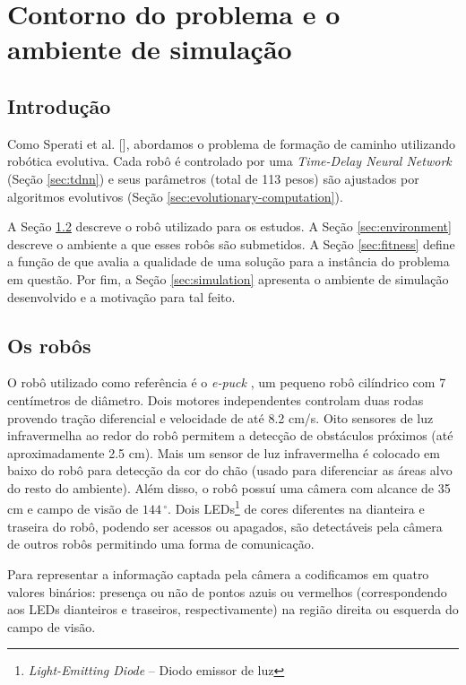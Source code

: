 \chapter{Contorno do problema e o ambiente de simulação}
\label{cha:problem-limits}

\section{Introdução}

Como Sperati et al. [\cite{sperati2011path}], abordamos o problema de formação de caminho utilizando robótica evolutiva. Cada robô é controlado por uma \textit{Time-Delay Neural Network} (Seção \ref{sec:tdnn}) e seus parâmetros (total de 113 pesos) são ajustados por algoritmos evolutivos (Seção \ref{sec:evolutionary-computation}).

A Seção \ref{sec:robots} descreve o robô utilizado para os estudos. A Seção \ref{sec:environment} descreve o ambiente a que esses robôs são submetidos. A Seção \ref{sec:fitness} define a função de \fitness que avalia a qualidade de uma solução para a instância do problema em questão. Por fim, a Seção \ref{sec:simulation} apresenta o ambiente de simulação desenvolvido e a motivação para tal feito.

\section{Os robôs}
\label{sec:robots}

O robô utilizado como referência é o \textit{e-puck} \cite{mondada2009epuck}, um pequeno robô cilíndrico com 7 centímetros de diâmetro. Dois motores independentes controlam duas rodas provendo tração diferencial e velocidade de até 8.2 cm/s. Oito sensores de luz infravermelha ao redor do robô permitem a detecção de obstáculos próximos (até aproximadamente 2.5 cm). Mais um sensor de luz infravermelha é colocado em baixo do robô para detecção da cor do chão (usado para diferenciar as áreas alvo do resto do ambiente). Além disso, o robô possuí uma câmera com alcance de 35 cm e campo de visão de $144\,^{\circ}$. Dois LEDs\footnote{\textit{Light-Emitting Diode} -- Diodo emissor de luz} de cores diferentes na dianteira e traseira do robô, podendo ser acessos ou apagados, são detectáveis pela câmera de outros robôs permitindo uma forma de comunicação.

Para representar a informação captada pela câmera a codificamos em quatro valores binários: presença ou não de pontos azuis ou vermelhos (correspondendo aos LEDs dianteiros e traseiros, respectivamente) na região direita ou esquerda do campo de visão.

